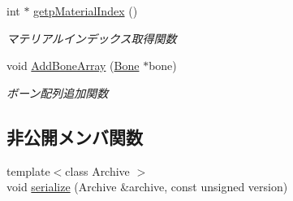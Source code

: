 \begin{DoxyCompactItemize}
int $\ast$ \mbox{\hyperlink{class_md_bin_data_1_1_mesh_ab0f1219a5fa3871c03777fa7bb1221c1}{getp\+Material\+Index}} ()
\begin{DoxyCompactList}\small\item\em マテリアルインデックス取得関数 \end{DoxyCompactList}\item 
void \mbox{\hyperlink{class_md_bin_data_1_1_mesh_af6c2e5fd653aff7a746c8c913b5175e7}{Add\+Bone\+Array}} (\mbox{\hyperlink{class_md_bin_data_1_1_mesh_1_1_bone}{Bone}} $\ast$bone)
\begin{DoxyCompactList}\small\item\em ボーン配列追加関数 \end{DoxyCompactList}\end{DoxyCompactItemize}
\subsection*{非公開メンバ関数}
\begin{DoxyCompactItemize}
\item 
{\footnotesize template$<$class Archive $>$ }\\void \mbox{\hyperlink{class_md_bin_data_1_1_mesh_ae3ea8741ba987736f141d4b20470293d}{serialize}} (Archive \&archive, const unsigned version)
\end{DoxyCompactItemize}
